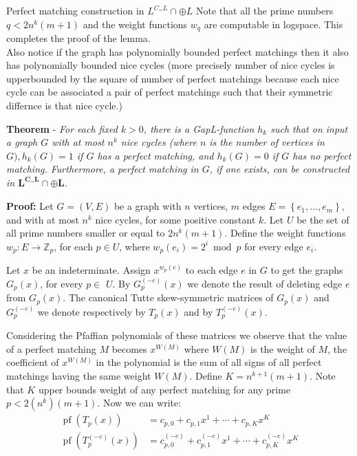 \documentclass{beamer}
\begin{document}
\begin{frame}[allowframebreaks]{Perfect matching construction in $L^{C_=L} \cap \oplus L$}
	Note that all the prime numbers $q<2 n^k(m+1)$ and the weight functions $w_q$ are computable in logspace. This completes the proof of the lemma.
	\\
	\break
	Also notice if the graph has polynomially bounded perfect matchings then it also has polynomially bounded nice cycles (more precisely number of nice cycles is upperbounded by the square of number of perfect matchings because each nice cycle can be associated a pair of perfect matchings such that their symmetric differnce is that nice cycle.)
	
	\break
	\textbf{Theorem} - \textit{For each fixed $k>0$, there is a GapL-function $h_k$ such that on input a graph $G$ with at most $n^k$ nice cycles (where $n$ is the number of vertices in $G), h_k(G)=1$ if $G$ has a perfect matching, and $h_k(G)=0$ if $G$ has no perfect matching. Furthermore, a perfect matching in $G$, if one exists, can be constructed in $\mathbf{L}^{\mathbf{C}_= \mathbf{L}} \cap \oplus \mathbf{L}$.}
	
	\textbf{Proof:} Let $G=(V, E)$ be a graph with $n$ vertices, $m$ edges $E=\left\{e_1, \ldots, e_m\right\}$, and with at most $n^k$ nice cycles, for some positive constant $k$. Let $U$ be the set of all prime numbers smaller or equal to $2 n^k(m+1)$. Define the weight functions $w_p: E \rightarrow \mathbb{Z}_p$, for each $p \in U$, where $w_p\left(e_i\right)=2^i \bmod p$ for every edge $e_i$.
	
	Let $x$ be an indeterminate. Assign $x^{w_p(e)}$ to each edge $e$ in $G$ to get the graphs $G_p(x)$, for every $p \in$ $U$. By $G_p^{(-e)}(x)$ we denote the result of deleting edge $e$ from $G_p(x)$. The canonical Tutte skew-symmetric matrices of $G_p(x)$ and $G_p^{(-e)}$ we denote respectively by $T_p(x)$ and by $T_p^{(-e)}(x)$.
	
	Considering the Pfaffian polynomials of these matrices we observe that the value of a perfect matching $M$ becomes $x^{W(M)}$ where $W(M)$ is the weight of $M$, the coefficient of $x^{W(M)}$ in the polynomial is the sum of all signs of all perfect matchings having the same weight $W(M)$. Define $K=n^{k+1}(m+1)$. Note that $K$ upper bounds weight of any perfect matching for any prime $p < 2(n^{k})(m+1)$. Now we can write:
	$$
	\begin{aligned}
		\operatorname{pf}\left(T_p(x)\right) & =c_{p, 0}+c_{p, 1} x^1+\cdots+c_{p, K} x^K \\
		\operatorname{pf}\left(T_p^{(-e)}(x)\right) & =c_{p, 0}^{(-e)}+c_{p, 1}^{(-e)} x^1+\cdots+c_{p, K}^{(-e)} x^K
	\end{aligned}
	$$
	

\end{frame}
\end{document}
